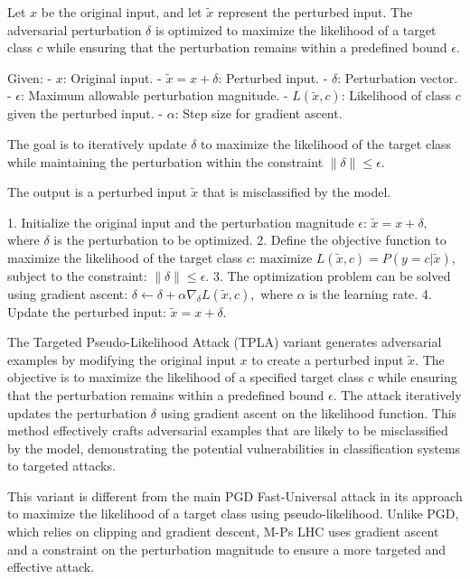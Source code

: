 Let $x$ be the original input, and let $\tilde{x}$ represent the perturbed input. The adversarial perturbation $\delta$ is optimized to maximize the likelihood of a target class $c$ while ensuring that the perturbation remains within a predefined bound $\epsilon$.

Given:
- $x$: Original input.
- $\tilde{x} = x + \delta$: Perturbed input.
- $\delta$: Perturbation vector.
- $\epsilon$: Maximum allowable perturbation magnitude.
- $L(\tilde{x}, c)$: Likelihood of class $c$ given the perturbed input.
- $\alpha$: Step size for gradient ascent.

The goal is to iteratively update $\delta$ to maximize the likelihood of the target class while maintaining the perturbation within the constraint $\|\delta\| \leq \epsilon$.

The output is a perturbed input $\tilde{x}$ that is misclassified by the model.

1. Initialize the original input and the perturbation magnitude $\epsilon$:
   $
   \tilde{x} = x + \delta,
   $
   where $\delta$ is the perturbation to be optimized.
2. Define the objective function to maximize the likelihood of the target class $c$:
   $
   \text{maximize } L(\tilde{x}, c) = P(y = c | \tilde{x}),
   $
   subject to the constraint:
   $
   \|\delta\| \leq \epsilon.
   $
3. The optimization problem can be solved using gradient ascent:
   $
   \delta \leftarrow \delta + \alpha \nabla_{\delta} L(\tilde{x}, c),
   $
   where $\alpha$ is the learning rate.
4. Update the perturbed input:
   $
   \tilde{x} = x + \delta.
   $

The Targeted Pseudo-Likelihood Attack (TPLA) variant generates adversarial examples by modifying the original input $x$ to create a perturbed input $\tilde{x}$. The objective is to maximize the likelihood of a specified target class $c$ while ensuring that the perturbation remains within a predefined bound $\epsilon$. The attack iteratively updates the perturbation $\delta$ using gradient ascent on the likelihood function. This method effectively crafts adversarial examples that are likely to be misclassified by the model, demonstrating the potential vulnerabilities in classification systems to targeted attacks.

This variant is different from the main PGD Fast-Universal attack in its approach to maximize the likelihood of a target class using pseudo-likelihood. Unlike PGD, which relies on clipping and gradient descent, M-Ps LHC uses gradient ascent and a constraint on the perturbation magnitude to ensure a more targeted and effective attack.